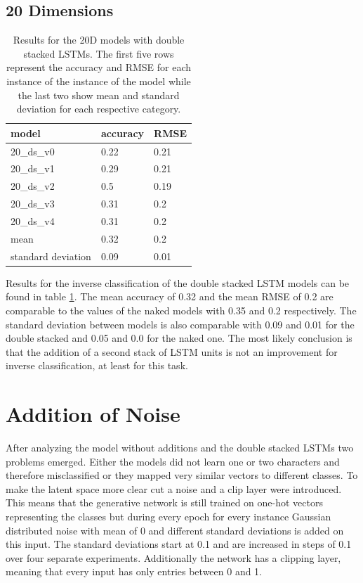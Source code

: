 \subsection{20 Dimensions}


\begin{table}[!htb]
	\centering
	\caption{Results for the 20D models with double stacked LSTMs. The first five rows represent the accuracy and RMSE for each instance of the instance of the model while the last two show mean and standard deviation for each respective category.}
	\label{table:20_ds}
	\begin{tabularx}{\textwidth}{ X  X  X }
		\hline
		model & accuracy & RMSE \\ 
		\hline
		20\_ds\_v0 & 0.22 & 0.21\\
		20\_ds\_v1 & 0.29 & 0.21\\
		20\_ds\_v2 & 0.5  & 0.19\\
		20\_ds\_v3 & 0.31 & 0.2 \\
		20\_ds\_v4 & 0.31 & 0.2 \\
		\hline 
		mean & 0.32 & 0.2  \\
		standard deviation & 0.09 & 0.01 \\
		\hline
	\end{tabularx}
\end{table}

Results for the inverse classification of the double stacked LSTM models can be found in table \ref{table:20_ds}. The mean accuracy of 0.32 and the mean RMSE of 0.2 are comparable to the values of the naked models with 0.35 and 0.2 respectively. The standard deviation between models is also comparable with 0.09 and 0.01 for the double stacked and 0.05 and 0.0 for the naked one. The most likely conclusion is that the addition of a second stack of LSTM units is not an improvement for inverse classification, at least for this task.


\section{Addition of Noise}

After analyzing the model without additions and the double stacked LSTMs two problems emerged. Either the models did not learn one or two characters and therefore misclassified or they mapped very similar vectors to different classes. To make the latent space more clear cut a noise and a clip layer were introduced. This means that the generative network is still trained on one-hot vectors representing the classes but during every epoch for every instance Gaussian distributed noise with mean of 0 and different standard deviations is added on this input. The standard deviations start at 0.1 and are increased in steps of 0.1 over four separate experiments. Additionally the network has a clipping layer, meaning that every input has only entries between 0 and 1.

